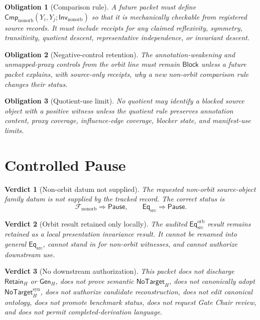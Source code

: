 \documentclass[11pt]{article}
\newcommand{\FamNon}{\mathcal{F}_{\mathrm{nonorb}}}
\newcommand{\InvNon}{\mathsf{Inv}_{\mathrm{nonorb}}}
\newcommand{\CmpNon}{\mathsf{Cmp}_{\mathrm{nonorb}}}
\newcommand{\EqSrc}{\mathsf{Eq}_{\mathrm{src}}}
\newcommand{\EqOrb}{\mathsf{Eq}_{\mathrm{src}}^{\mathrm{orb}}}
\newcommand{\GenH}{\mathsf{Gen}_{H}}
\newcommand{\RetainH}{\mathsf{Retain}_{H}}
\newcommand{\NoTargetH}{\mathsf{NoTarget}_{H}}
\newcommand{\NoTargetSyn}{\mathsf{NoTarget}_{H}^{\mathrm{syn}}}
\newcommand{\Block}{\mathsf{Block}}
\newcommand{\Pause}{\mathsf{Pause}}
\newtheorem{obligation}{Obligation}
\newtheorem{verdict}{Verdict}
\begin{document}
\begin{obligation}[Comparison rule]
A future packet must define \(\CmpNon(Y_i,Y_j;\InvNon)\) so that it is
mechanically checkable from registered source records. It must include
receipts for any claimed reflexivity, symmetry, transitivity, quotient
descent, representative independence, or invariant descent.
\end{obligation}

\begin{obligation}[Negative-control retention]
The annotation-weakening and unmapped-proxy controls from the orbit line
must remain \(\Block\) unless a future packet explains, with source-only
receipts, why a new non-orbit comparison rule changes their status.
\end{obligation}

\begin{obligation}[Quotient-use limit]
No quotient may identify a blocked source object with a positive witness
unless the quotient rule preserves annotation content, proxy coverage,
influence-edge coverage, blocker state, and manifest-use limits.
\end{obligation}

\section{Controlled Pause}

\begin{verdict}[Non-orbit datum not supplied]
The requested non-orbit source-object family datum is not supplied by the
tracked record. The correct status is
\[
    \FamNon \Rightarrow \Pause,\qquad
    \EqSrc \Rightarrow \Pause.
\]
\end{verdict}

\begin{verdict}[Orbit result retained only locally]
The audited \(\EqOrb\) result remains retained as a local presentation
invariance result. It cannot be renamed into general \(\EqSrc\), cannot
stand in for non-orbit witnesses, and cannot authorize downstream use.
\end{verdict}

\begin{verdict}[No downstream authorization]
This packet does not discharge \(\RetainH\) or \(\GenH\), does not prove
semantic \(\NoTargetH\), does not canonically adopt \(\NoTargetSyn\), does
not authorize candidate reconstruction, does not edit canonical ontology,
does not promote benchmark status, does not request Gate Chair review, and
does not permit completed-derivation language.
\end{verdict}
\end{document}
